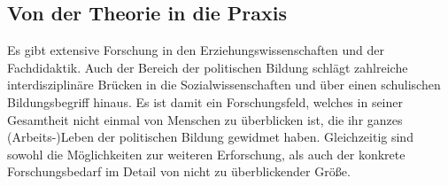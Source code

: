

\subsection{Von der Theorie in die Praxis \label{theorie in praxis}}
Es gibt extensive Forschung in den Erziehungswissenschaften und der Fachdidaktik. Auch der Bereich der politischen Bildung schlägt zahlreiche interdisziplinäre Brücken in die Sozialwissenschaften und über einen schulischen Bildungsbegriff hinaus. Es ist damit ein Forschungsfeld, welches in seiner Gesamtheit nicht einmal von Menschen zu überblicken ist, die ihr ganzes (Arbeits-)Leben der politischen Bildung gewidmet haben. 
Gleichzeitig sind sowohl die Möglichkeiten zur weiteren Erforschung, als auch der konkrete Forschungsbedarf im Detail von nicht zu überblickender Größe. 

